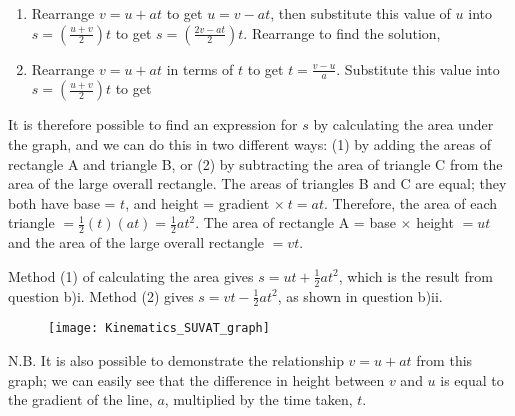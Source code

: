 \begin{problem}
{\begin{enumerate}
\begin{enumerate}
		\item Rearrange $v = u + at$ to get $u = v - at$, then substitute this value of $u$ into $s = \left(\frac{u + v}{2}\right)t$ to get $s = \left(\frac{2v - at}{2}\right)t$. Rearrange to find the solution, 
		\item Rearrange $v = u + at$ in terms of $t$ to get $t = \frac{v - u}{a}$. Substitute this value into $s = \left(\frac{u + v}{2}\right)t$ to get 
	\end{enumerate}
	 It is therefore possible to find an expression for $s$ by calculating the area under the graph, and we can do this in two different ways: (1) by adding the areas of rectangle A and triangle B, or (2) by subtracting the area of triangle C from the area of the large overall rectangle. The areas of triangles B and C are equal; they both have base = $t$, and height = gradient $\times~t = at$. Therefore, the area of each triangle $= \frac{1}{2}(t)(at) = \frac{1}{2}at^{2}$. The area of rectangle A = base $\times$ height $= ut$ and the area of the large overall rectangle $= vt$.

Method (1) of calculating the area gives $s = ut + \frac{1}{2}at^{2}$, which is the result from question b)i. Method (2) gives $s = vt - \frac{1}{2}at^{2}$, as shown in question b)ii.
\begin{figure}[h]
\centering
\texttt{[image: Kinematics\_SUVAT\_graph]}
\caption{}
\label{fig:Kinematics_SUVAT_graph}
\end{figure}	

N.B. It is also possible to demonstrate the relationship $v = u + at$ from this graph; we can easily see that the difference in height between $v$ and $u$ is equal to the gradient of the line, $a$, multiplied by the time taken, $t$.
\end{enumerate}
 }
\end{problem}